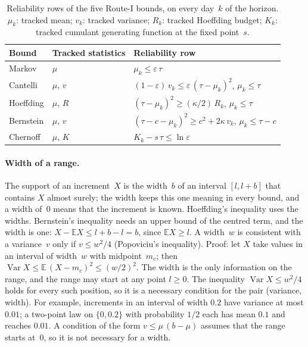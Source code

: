 \documentclass[11pt,a4paper]{article}
\theoremstyle{plain}
\theoremstyle{definition}
\theoremstyle{remark}
\begin{document}
\begin{table}[htbp]
\centering
\caption{Reliability rows of the five Route-I bounds, on every day~$k$ of the horizon.
$\mu_k$: tracked mean; $v_k$: tracked variance; $R_k$: tracked Hoeffding budget; $K_k$: tracked cumulant generating function at the fixed point~$s$.}
\label{tab:five_bounds}
\small
\begin{tabular}{@{}lll@{}}
\toprule
\textbf{Bound} & \textbf{Tracked statistics} & \textbf{Reliability row} \\
\midrule
Markov    & $\mu$       & $\mu_k \le \varepsilon\,\tau$ \\
Cantelli  & $\mu$, $v$  & $(1-\varepsilon)\,v_k \le \varepsilon\,(\tau - \mu_k)^2$, \quad $\mu_k \le \tau$ \\
Hoeffding & $\mu$, $R$  & $(\tau - \mu_k)^2 \ge (\kappa/2)\,R_k$, \quad $\mu_k \le \tau$ \\
Bernstein & $\mu$, $v$  & $(\tau - c - \mu_k)^2 \ge c^2 + 2\kappa\, v_k$, \quad $\mu_k \le \tau - c$ \\
Chernoff  & $\mu$, $K$  & $K_k - s\,\tau \le \ln\varepsilon$ \\
\bottomrule
\end{tabular}
\end{table}

\paragraph{Width of a range.}
The support of an increment~$X$ is the width~$b$ of an interval $[l, l + b]$ that contains $X$ almost surely; the width keeps this one meaning in every bound, and a width of~$0$ means that the increment is known.
Hoeffding's inequality uses the widths.
Bernstein's inequality needs an upper bound of the centred term, and the width is one: $X - \mathbb{E}X \le l + b - l = b$, since $\mathbb{E}X \ge l$.
A width~$w$ is consistent with a variance~$v$ only if $v \le w^2/4$ (Popoviciu's inequality).
Proof: let $X$ take values in an interval of width~$w$ with midpoint~$m_c$; then $\operatorname{Var} X \le \mathbb{E}\,(X - m_c)^2 \le (w/2)^2$.
The width is the only information on the range, and the range may start at any point $l \ge 0$.
The inequality $\operatorname{Var} X \le w^2/4$ holds for every such position, so it is a necessary condition for the pair (variance, width).
For example, increments in an interval of width $0.2$ have variance at most $0.01$; a two-point law on $\{0, 0.2\}$ with probability $1/2$ each has mean $0.1$ and reaches $0.01$.
A condition of the form $v \le \mu\,(b - \mu)$ assumes that the range starts at~$0$, so it is not necessary for a width.
\end{document}
